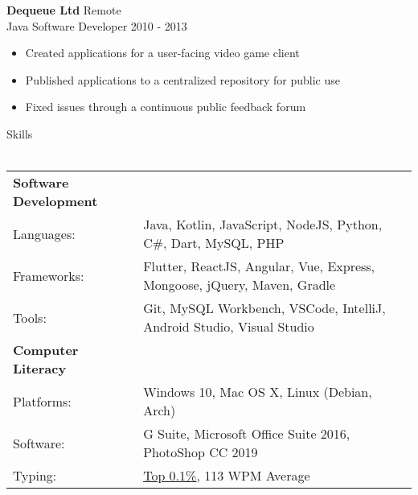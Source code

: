 \documentclass[a4paper]{article}
\newcommand{\lineunder} {
    \vspace*{-8pt} \\
    \hspace*{-18pt} \hrulefill \\
}
\newcommand{\header} [1] {
    {\hspace*{-18pt}\vspace*{6pt} {#1}}
    \vspace*{-6pt} \lineunder
}
\newcommand{\subheader} [1] {
    \hspace{2pt}
    \textbf{
        {\hspace*{-18pt}\vspace*{6pt} {#1}}
        \vspace*{-6pt}
    }
    \\
}
\begin{document}
\vspace{-2mm}

\textbf{Dequeue Ltd} \hfill Remote\\
Java Software Developer \hfill 2010 - 2013\\
\vspace{-2.5mm}
\begin{itemize} \itemsep 1pt
    \item Created applications for a user-facing video game client
    \vspace{-1mm}
	\item Published applications to a centralized repository for public use
	\vspace{-1mm}
	\item Fixed issues through a continuous public feedback forum
\end{itemize}

\header{Skills}
\vspace{2mm}
\begin{tabular}{ l l }
    \subheader{Software Development}
    \hspace{-3mm}
	Languages:      & Java, Kotlin, JavaScript, NodeJS, Python, C\#, Dart, MySQL, PHP    \\
    \hspace{-3mm}
	Frameworks:     & Flutter, ReactJS, Angular, Vue, Express, Mongoose, jQuery, Maven, Gradle \\
    \hspace{-3mm}
	Tools:          & Git, MySQL Workbench, VSCode, IntelliJ, Android Studio, Visual Studio
	\vspace{1mm}\\
    \subheader{Computer Literacy}
    \hspace{-3mm}
	Platforms:  & Windows 10, Mac OS X, Linux (Debian, Arch) \\
    \hspace{-3mm}
	Software:   & G Suite, Microsoft Office Suite 2016, PhotoShop CC 2019  \\
    \hspace{-3mm}
	Typing:     & \href{https://data.typeracer.com/misc/badge?user=tsedlar}{\ul{Top 0.1\%}}, 113 WPM Average \\
\end{tabular}

\vspace*{2mm}
\end{document}
